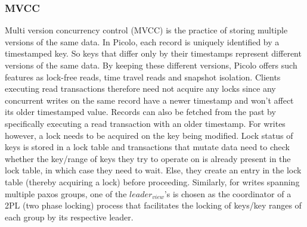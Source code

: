 \subsubsection{MVCC}
Multi version concurrency control (MVCC) is the practice of storing multiple versions of the same data. In Picolo, each record is uniquely identified by a timestamped key. So keys that differ only by their timestamps represent different versions of the same data. By keeping these different versions, Picolo offers such features as lock-free reads, time travel reads and snapshot isolation. Clients executing read transactions therefore need not acquire any locks since any concurrent writes on the same record have a newer timestamp and won't affect its older timestamped value. Records can also be fetched from the past by specifically executing a read transaction with an older timestamp. For writes however, a lock needs to be acquired on the key being modified. Lock status of keys is stored in a lock table and transactions that mutate data need to check whether the key/range of keys they try to operate on is already present in the lock table, in which case they need to wait. Else, they create an entry in the lock table (thereby acquiring a lock) before proceeding. Similarly, for writes spanning multiple paxos groups, one of the $leader_{view}$'s is chosen as the coordinator of a 2PL (two phase locking) process that facilitates the locking of keys/key ranges of each group by its respective leader.

